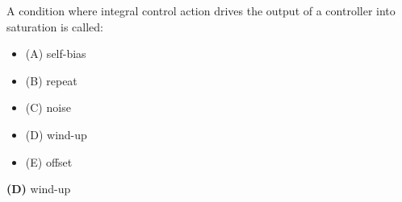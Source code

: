 

A condition where integral control action drives the output of a controller into saturation is called:

\begin{itemize}
\item{(A)} self-bias
\vskip 5pt 
\item{(B)} repeat
\vskip 5pt 
\item{(C)} noise
\vskip 5pt 
\item{(D)} wind-up
\vskip 5pt 
\item{(E)} offset
\end{itemize}







{\bf (D)} wind-up











